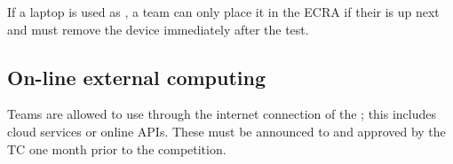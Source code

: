 If a laptop is used as \ExternalComputing, a team can only place it in the ECRA if their \Testslot{} is up next and must remove the device immediately after the test.

\subsection{On-line external computing}\label{rule:robot_external_computing_online}

Teams are allowed to use \ExternalComputing{} through the internet connection of the \ArenaNetwork{}; this includes cloud services or online APIs.
These must be announced to and approved by the TC one month prior to the competition.

